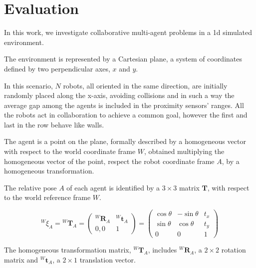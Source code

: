 \chapter{Evaluation}
\label{chap:experiments}


In this work, we investigate collaborative multi-agent problems in a \gls{1d} 
simulated environment.

The environment is represented by a Cartesian plane, a system of coordinates
defined by two perpendicular axes, $x$ and $y$. 

In this scenario, $N$ robots, all oriented in the same direction, are initially 
randomly placed along the x-axis, avoiding collisions and in such a way the 
average gap among the agents is included in the proximity sensors' ranges. 
All the robots act in collaboration to achieve a common goal, however the first 
and last in the row behave like walls. %

The agent is a point on the plane, formally described by a homogeneous vector 
with respect to the world coordinate frame $W$, obtained multiplying the 
homogeneous vector of the point, respect the robot coordinate frame $A$, by a 
homogeneous transformation. 

The relative pose $A$ of each agent is identified by a $3 \times 3$ matrix 
$\mathbf{T}$, with respect to the world reference frame $W$. 

\begin{Equation}[!htb]
	\centering
	\begin{equation}
	{^W\!\xi_A} = {^W\!\mathbf{T}_A} 
	=
	\begin{pmatrix}
	^W\!\mathbf{R}_A & ^W\!\mathbf{t}_A\\
	0, 0 & 1
	\end{pmatrix}
	=
	\begin{pmatrix}
	\cos \theta & - \sin \theta & t_x\\
	\sin \theta & \cos \theta & t_y\\
	0 & 0 & 1
	\end{pmatrix}
	\end{equation}
	\caption[Homogeneous transformation matrix.]{The homogeneous 
	transformation matrix, 	$^W\!\mathbf{T}_A$, includes $^W\!\mathbf{R}_A$, a 
	$2 \times 2$ rotation matrix and $^W\!\mathbf{t}_A$, a $2 \times 1$ 
	translation vector.}
	\label{eq:hommatrix}
\end{Equation}

